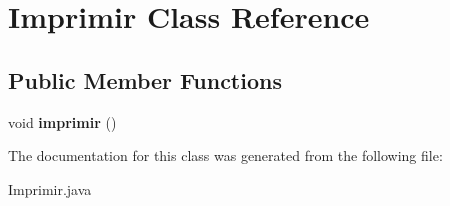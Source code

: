 \section{Imprimir Class Reference}
\label{class_imprimir}
\subsection*{Public Member Functions}
\begin{DoxyCompactItemize}
\item 
\mbox{\label{class_imprimir_a3184a1cc7cc695f7a3fbf345b84f44d1}} 
void {\bfseries imprimir} ()
\end{DoxyCompactItemize}


The documentation for this class was generated from the following file\+:\begin{DoxyCompactItemize}
\item 
Imprimir.\+java\end{DoxyCompactItemize}
